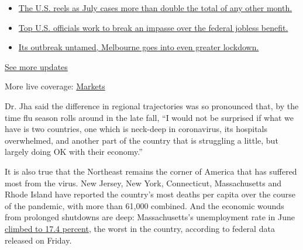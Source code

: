\begin{itemize}
\tightlist
\item
  \href{https://www.nytimes.com/2020/08/01/world/coronavirus-covid-19.html?action=click\&pgtype=Article\&state=default\&region=MAIN_CONTENT_1\&context=storylines_live_updates\#link-34047410}{The
  U.S. reels as July cases more than double the total of any other
  month.}
\item
  \href{https://www.nytimes.com/2020/08/01/world/coronavirus-covid-19.html?action=click\&pgtype=Article\&state=default\&region=MAIN_CONTENT_1\&context=storylines_live_updates\#link-780ec966}{Top
  U.S. officials work to break an impasse over the federal jobless
  benefit.}
\item
  \href{https://www.nytimes.com/2020/08/01/world/coronavirus-covid-19.html?action=click\&pgtype=Article\&state=default\&region=MAIN_CONTENT_1\&context=storylines_live_updates\#link-2bc8948}{Its
  outbreak untamed, Melbourne goes into even greater lockdown.}
\end{itemize}

\href{https://www.nytimes.com/2020/08/01/world/coronavirus-covid-19.html?action=click\&pgtype=Article\&state=default\&region=MAIN_CONTENT_1\&context=storylines_live_updates}{See
more updates}

More live coverage:
\href{https://www.nytimes.com/live/2020/07/31/business/stock-market-today-coronavirus?action=click\&pgtype=Article\&state=default\&region=MAIN_CONTENT_1\&context=storylines_live_updates}{Markets}

Dr. Jha said the difference in regional trajectories was so pronounced
that, by the time flu season rolls around in the late fall, ``I would
not be surprised if what we have is two countries, one which is
neck-deep in coronavirus, its hospitals overwhelmed, and another part of
the country that is struggling a little, but largely doing OK with their
economy.''

It is also true that the Northeast remains the corner of America that
has suffered most from the virus. New Jersey, New York, Connecticut,
Massachusetts and Rhode Island have reported the country's most deaths
per capita over the course of the pandemic, with more than 61,000
combined. And the economic wounds from prolonged shutdowns are deep:
Massachusetts's unemployment rate in June
\href{https://www.wbur.org/bostonomix/2020/07/17/massachusetts-unemployment-rate-worst-country}{climbed
to 17.4 percent}, the worst in the country, according to federal data
released on Friday.

